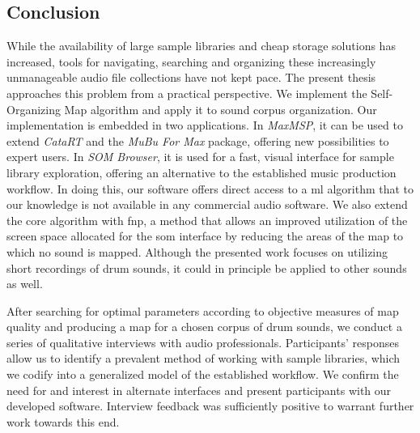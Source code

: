 \subsection{Conclusion}
\label{subsubsec:discussion_conclusion}
While the availability of large sample libraries and cheap storage solutions has
increased, tools for navigating, searching and organizing these increasingly
unmanageable audio file collections have not kept pace. The present thesis
approaches this problem from a practical perspective. We implement the
Self-Organizing Map algorithm and apply it to sound corpus organization. Our
implementation is embedded in two applications. In \textit{MaxMSP}, it can be
used to extend \textit{CataRT} and the \textit{MuBu For Max} package, offering
new possibilities to expert users. In \textit{SOM Browser}, it is used for a
fast, visual interface for sample library exploration, offering an alternative
to the established music production workflow. In doing this, our software offers
direct access to a \gls{ml} algorithm that to our knowledge is not available in
any commercial audio software. We also extend the core algorithm with \gls{fnp},
a method that allows an improved utilization of the screen space allocated for
the \gls{som} interface by reducing the areas of the map to which no sound is
mapped. Although the presented work focuses on utilizing short recordings of
drum sounds, it could in principle be applied to other sounds as well.

\smallskip


After searching for optimal parameters according to objective measures of map
quality and producing a map for a chosen corpus of drum sounds, we conduct a
series of qualitative interviews with audio professionals. Participants'
responses allow us to identify a prevalent method of working with sample
libraries, which we codify into a generalized model of the established workflow.
We confirm the need for and interest in alternate interfaces and present
participants with our developed software. Interview feedback was sufficiently
positive to warrant further work towards this end.
